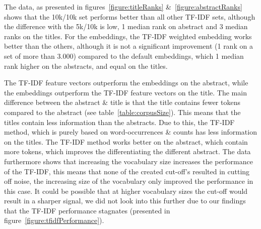\documentclass[../../Thesis.tex]{subfiles}
\begin{document}
\begin{jumpin}
The data, as presented in figures~\ref{figure:titleRanks} \&~\ref{figure:abstractRanks} shows that the 10k/10k set performs better than all other TF-IDF sets, although the difference with the 5k/10k is low, 1  median rank on abstract and 3 median ranks on the titles. For the embeddings, the TF-IDF weighted embedding works better than the others, although it is not a significant improvement (1 rank on a set of more than 3.000) compared to the default embeddings, which 1 median rank higher on the abstracts, and equal on the titles. 

The TF-IDF feature vectors outperform the embeddings on the abstract, while the embeddings outperform the TF-IDF feature vectors on the title. The main difference between the abstract \& title is that the title contains fewer tokens compared to the abstract (see table~\ref{table:corpusSize}). This means that the titles contain less information than the abstracts. Due to this, the TF-IDF method, which is purely based on word-occurrences \& counts has less information on the titles. The TF-IDF method works better on the abstract, which contain more tokens, which improves the differentiating the different abstract. The data furthermore shows that increasing the vocabulary size increases the performance of the TF-IDF, this means that none of the created cut-off's resulted in cutting off noise, the increasing size of the vocabulary only improved the performance in this case. It could be possible that at higher vocabulary sizes the cut-off would result in a sharper signal, we did not look into this further due to our findings that the TF-IDF performance stagnates (presented in figure~\ref{figure:tfidfPerformance}).


\end{jumpin}
\end{document}

